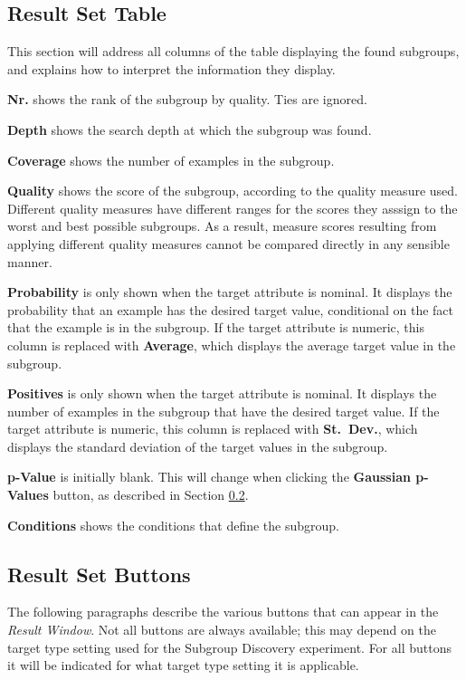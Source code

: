 \documentclass{article}
\begin{document}
\subsection{Result Set Table}

This section will address all columns of the table displaying the found
subgroups, and explains how to interpret the information they display.

\textbf{Nr.} shows the rank of the subgroup by quality.  Ties are ignored.

\textbf{Depth} shows the \gls{search depth} at which the subgroup was
found.  

\textbf{Coverage} shows the number of examples in the subgroup.  

\textbf{Quality} shows the score of the subgroup, according to the quality
measure used.  Different quality measures have different ranges for the
scores they asssign to the worst and best possible subgroups.  As a result,
measure scores resulting from applying different quality measures cannot be
compared directly in any sensible manner.

\textbf{Probability} is only shown when the target attribute is
\gls{nominal}. It displays the probability that an example has the desired
target value, conditional on the fact that the example is in the subgroup. 
If the target attribute is \gls{numeric}, this column is replaced with
\textbf{Average}, which displays the average target value in the subgroup.

\textbf{Positives} is only shown when the target attribute is \gls{nominal}.
It displays the number of examples in the subgroup that have the desired
target value. If the target attribute is \gls{numeric}, this column is
replaced with \textbf{St.~Dev.}, which displays the standard deviation of
the target values in the subgroup.

\textbf{p-Value} is initially blank. This will change when clicking the
\textbf{Gaussian p-Values} button, as described in Section
\ref{sec:buttons}.

\textbf{Conditions} shows the conditions that define the subgroup.

\subsection{Result Set Buttons}
\label{sec:buttons}

The following paragraphs describe the various buttons that can appear in
the \emph{Result Window}.  Not all buttons are always available; this may
depend on the target type setting used for the Subgroup Discovery
experiment.  For all buttons it will be indicated for what target type
setting it is applicable.
\end{document}
